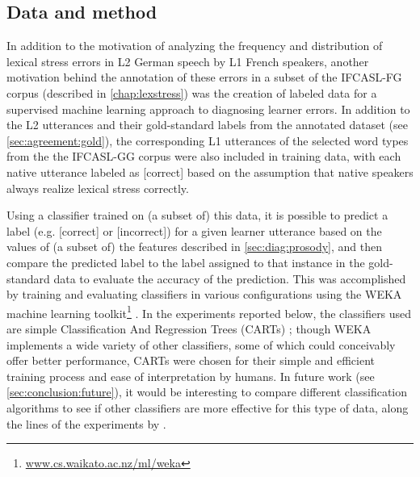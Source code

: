 	\subsection{Data and method}
	\label{sec:classification:datamethod}
	
		
		In addition to the motivation of analyzing the frequency and distribution of lexical stress errors in L2 German speech by L1 French speakers, another motivation behind the annotation of these errors in a subset of the IFCASL-FG corpus (described in \cref{chap:lexstress}) was the creation of labeled data for a supervised machine learning approach to diagnosing learner errors. In addition to the L2 utterances and their gold-standard labels from the annotated dataset (see \cref{sec:agreement:gold}), the corresponding L1 utterances of the selected word types from the the IFCASL-GG corpus were also included in training data, with each native utterance labeled as [correct] based on the assumption that native speakers always realize lexical stress correctly.
		
		Using a classifier trained on (a subset of) this data, it is possible to predict a label (e.g. [correct] or [incorrect]) for a given learner utterance based on the values of (a subset of) the features described in \cref{sec:diag:prosody}, and then compare the predicted label to the label assigned to that instance in the gold-standard data to evaluate the accuracy of the prediction. 
		This was accomplished by training and evaluating classifiers in various configurations using the WEKA machine learning toolkit\footnote{\url{www.cs.waikato.ac.nz/ml/weka}} \citep{Hall2009}. 	
		In the experiments reported below, 
		the classifiers used are
		simple Classification And Regression Trees (CARTs) \citep{Breiman1984}; 
		though WEKA implements a wide variety of other classifiers, some of which 
		could conceivably offer better performance,
		CARTs were chosen for their simple and efficient training process and ease of interpretation by humans.
		In future work (see \cref{sec:conclusion:future}), it would be interesting to compare different classification algorithms to see if other classifiers are more effective for this type of data, along the lines of the experiments by \textcite{Kim2011}.
		
